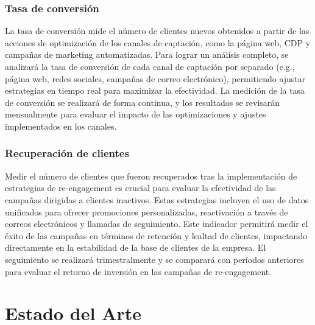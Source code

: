 \documentclass[12pt]{article}
\begin{document}
\subsubsection{Tasa de conversión}
\noindent
La tasa de conversión mide el número de clientes nuevos obtenidos a partir de las acciones de optimización de los canales de captación, como la página web, CDP y campañas de marketing automatizadas. Para lograr un análisis completo, se analizará la tasa de conversión de cada canal de captación por separado (e.g., página web, redes sociales, campañas de correo electrónico), permitiendo ajustar estrategias en tiempo real para maximizar la efectividad. La medición de la tasa de conversión se realizará de forma continua, y los resultados se revisarán mensualmente para evaluar el impacto de las optimizaciones y ajustes implementados en los canales.
\subsubsection{Recuperación de clientes}
\noindent
Medir el número de clientes que fueron recuperados tras la implementación de estrategias de re-engagement es crucial para evaluar la efectividad de las campañas dirigidas a clientes inactivos. Estas estrategias incluyen el uso de datos unificados para ofrecer promociones personalizadas, reactivación a través de correos electrónicos y llamadas de seguimiento. Este indicador permitirá medir el éxito de las campañas en términos de retención y lealtad de clientes, impactando directamente en la estabilidad de la base de clientes de la empresa. El seguimiento se realizará trimestralmente y se comparará con períodos anteriores para evaluar el retorno de inversión en las campañas de re-engagement.


\newpage

\section{Estado del Arte}
\end{document}
